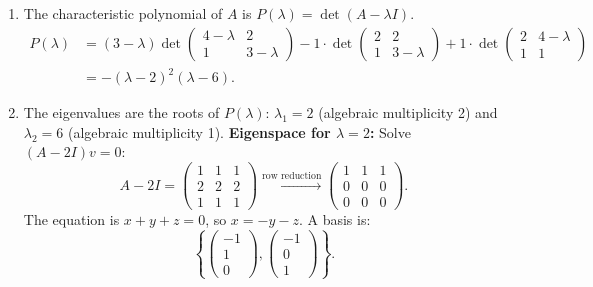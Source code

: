 \documentclass[12pt]{article}
\begin{document}
\begin{correctionbox}
\begin{enumerate}
    \item The characteristic polynomial of $A$ is $P(\lambda) = \det(A - \lambda I)$.
    \begin{align*}
    P(\lambda) &= (3-\lambda)\det\begin{pmatrix}4-\lambda & 2 \\ 1 & 3-\lambda\end{pmatrix} 
    - 1\cdot\det\begin{pmatrix}2 & 2 \\ 1 & 3-\lambda\end{pmatrix} 
    + 1\cdot\det\begin{pmatrix}2 & 4-\lambda \\ 1 & 1\end{pmatrix} \\
    &= -(\lambda-2)^2(\lambda-6).
    \end{align*}
    
    \item The eigenvalues are the roots of $P(\lambda)$: $\lambda_1 = 2$ (algebraic multiplicity 2) and $\lambda_2 = 6$ (algebraic multiplicity 1).
    \textbf{Eigenspace for $\lambda = 2$:} Solve $(A - 2I)v = 0$:
    \[
    A - 2I = \begin{pmatrix}
    1 & 1 & 1 \\
    2 & 2 & 2 \\
    1 & 1 & 1
    \end{pmatrix} \xrightarrow{\text{row reduction}} \begin{pmatrix}
    1 & 1 & 1 \\
    0 & 0 & 0 \\
    0 & 0 & 0
    \end{pmatrix}.
    \]
    The equation is $x + y + z = 0$, so $x = -y - z$. A basis is:
    \[
    \left\{ \begin{pmatrix}-1 \\ 1 \\ 0\end{pmatrix}, \begin{pmatrix}-1 \\ 0 \\ 1\end{pmatrix} \right\}.
    \]


\end{enumerate}
\end{correctionbox}
\end{document}
